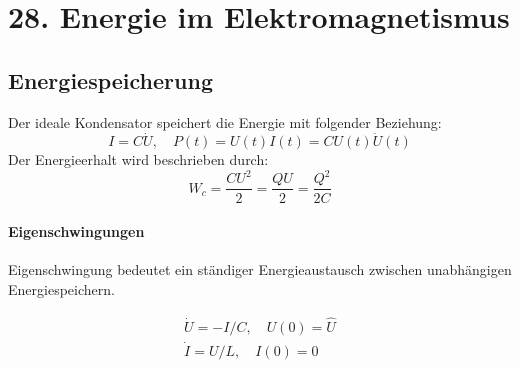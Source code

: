 \documentclass[12pt]{article}
\begin{document}
\section*{28. Energie im Elektromagnetismus}
\subsection{Energiespeicherung }
Der ideale Kondensator speichert die Energie mit folgender Beziehung: 
\begin{equation}\label{key}
I = C\dot{U},\quad P(t) = U(t) I(t) = C U(t) \dot{U}(t)
\end{equation}
\noindent
Der Energieerhalt wird beschrieben durch: 
\begin{equation}\label{key}
W_c = \frac{CU^2}{2}=\frac{QU}{2}=\frac{Q^2}{2C}
\end{equation}

\paragraph{Eigenschwingungen}
Eigenschwingung bedeutet ein ständiger Energieaustausch zwischen unabhängigen Energiespeichern. 

\begin{align}
\dot{U}=-I/C, \quad  U(0) = \hat{U} \\
\dot{I}=U/L, \quad I(0) = 0 
\end{align}
\end{document}
